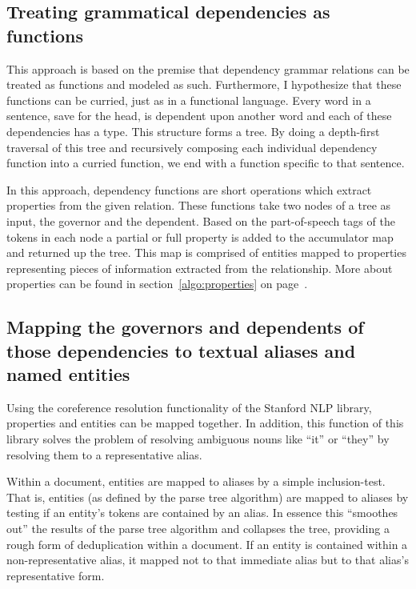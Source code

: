 \documentclass[11pt]{article}
\begin{document}
\subsection{Treating grammatical dependencies as functions}

This approach is based on the premise that dependency grammar relations can be treated as functions and modeled as such.  Furthermore, I hypothesize that these functions can be curried, just as in a functional language.  Every word in a sentence, save for the head, is dependent upon another word and each of these dependencies has a type.  This structure forms a tree.  By doing a depth-first traversal of this tree and recursively composing each individual dependency function into a curried function, we end with a function specific to that sentence.

In this approach, dependency functions are short operations which extract properties from the given relation.  These functions take two nodes of a tree as input, the governor and the dependent.  Based on the part-of-speech tags of the tokens in each node a partial or full property is added to the accumulator map and returned up the tree.  This map is comprised of entities mapped to properties representing pieces of information extracted from the relationship.  More about properties can be found in section~\ref{algo:properties} on page~\pageref{algo:properties}.




\subsection{Mapping the governors and dependents of those dependencies to textual aliases and named entities}

Using the coreference resolution functionality of the Stanford NLP library, properties and entities can be mapped together.  In addition, this function of this library solves the problem of resolving ambiguous nouns like ``it'' or ``they'' by resolving them to a representative alias.

Within a document, entities are mapped to aliases by a simple inclusion-test.  That is, entities (as defined by the parse tree algorithm) are mapped to aliases by testing if an entity's tokens are contained by an alias.  In essence this ``smoothes out'' the results of the parse tree algorithm and collapses the tree, providing a rough form of deduplication within a document.  If an entity is contained within a non-representative alias, it mapped not to that immediate alias but to that alias's representative form.   
\end{document}
